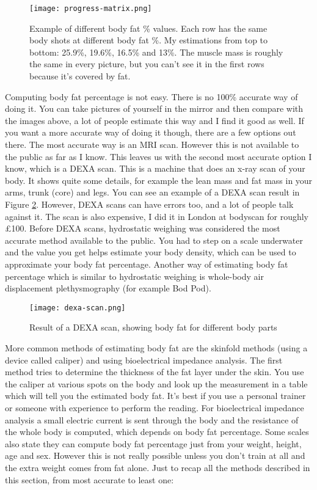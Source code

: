 \documentclass[openany, 12pt]{book}
\begin{document}
	\begin{figure}[h]
		\centering
		\texttt{[image: progress-matrix.png]}
		\caption{Example of different body fat \% values. Each row has the same body shots at different body fat \%. My estimations from top to bottom: 25.9\%, 19.6\%, 16.5\% and 13\%.
                The muscle mass is roughly the same in every picture, but you can't see it in the first rows because it's covered by fat.}
                \label{bodyfat}
	\end{figure}
	
	Computing body fat percentage is not easy. There is no 100\% accurate way of doing it. You can take pictures of yourself in the mirror and then compare with the images above,
        a lot of people estimate this way and I find it good as well. If you want a more accurate way of doing it though, there are a few options out there. The most accurate way is an MRI scan.
        However this is not available to the public as far as I know. This leaves us with the second most accurate option I know, which is a DEXA scan.
        This is a machine that does an x-ray scan of your body. It shows quite some details,
        for example the lean mass and fat mass in your arms, trunk (core) and legs. You can see an example of a DEXA scan result in Figure \ref{dexa}.
        However, DEXA scans can have errors too, and a lot of people talk against it. The scan is also expensive, I did it in London at bodyscan for roughly \pounds 100.
	Before DEXA scans, hydrostatic weighing was considered the most accurate method
        available to the public. You had to step on a scale underwater and the value you get helps estimate your body density, which can be used to approximate your body fat percentage.
        Another way of estimating body fat percentage which is similar to hydrostatic weighing is whole-body air displacement plethysmography
        (for example Bod Pod).
        
	\begin{figure}[h]
		\centering
		\texttt{[image: dexa-scan.png]}
		\caption{Result of a DEXA scan, showing body fat for different body parts}
                \label{dexa}
	\end{figure}
	
	More common methods of estimating body fat are the skinfold methods
        (using a device called caliper) and using bioelectrical impedance analysis.
        The first method tries to determine the thickness of the fat layer under the skin. You use the caliper at various spots on the body and look up the measurement in
        a table which will tell you the estimated body fat. It's best if you use a personal trainer or someone with experience to perform the reading. For bioelectrical impedance analysis a small
        electric current is sent through the body and the resistance of the whole body is computed, which depends on body fat percentage. Some scales also state they can compute body fat percentage
        just from your weight, height, age and sex. However this is not really possible unless you don't train at all and the extra weight comes from fat alone. Just to recap all the methods
        described in this section, from most accurate to least one:
	
\end{document}
